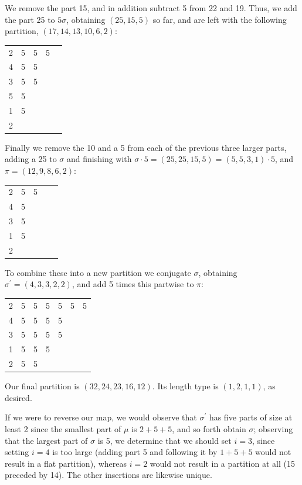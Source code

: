\documentclass{amsart}
\begin{document}
We remove the part 15, and in addition subtract 5 from 22 and 19.  Thus, we add the part 25 to $5\sigma$, obtaining $(25,15,5)$ so far, and are left with the following partition, $(17, 14, 13, 10, 6, 2)$:

\begin{center}
\begin{tabular}{ccccc}
2 & 5 & 5 & 5 & \\
4 & 5 & 5 & & \\
3 & 5 & 5 & & \\
5 & 5 & & & \\
1 & 5 & & & \\
2 & & & & 
\end{tabular}
\end{center}

Finally we remove the 10 and a 5 from each of the previous three larger parts, adding a 25 to $\sigma$ and finishing with $\sigma \cdot 5 = (25,25,15,5) = (5,5,3,1)\cdot 5$, and $\pi = (12,9,8,6,2)$:

\begin{center}
\begin{tabular}{ccccc}
2 & 5 & 5 & & \\
4 & 5 & & & \\
3 & 5 & & & \\
1 & 5 & & & \\
2 & & & & 
\end{tabular}
\end{center}

To combine these into a new partition we conjugate $\sigma$, obtaining $\sigma^{\prime} = (4,3,3,2,2)$, and add 5 times this partwise to $\pi$:

\begin{center}
\begin{tabular}{ccccccc}
2 & 5 & 5 & 5 & 5 & 5 & 5 \\
4 & 5 & 5 & 5 & 5 & & \\
3 & 5 & 5 & 5 & 5 & & \\
1 & 5 & 5 & 5 & & & \\
2 & 5 & 5 & & & & 
\end{tabular}
\end{center}

Our final partition is $(32, 24, 23, 16, 12)$.  Its length type is $(1,2,1,1)$, as desired.

If we were to reverse our map, we would observe that $\sigma^{\prime}$ has five parts of size at least 2 since the smallest part of $\mu$ is $2+5+5$, and so forth obtain $\sigma$; observing that the largest part of $\sigma$ is 5, we determine that we should set $i=3$, since setting $i=4$ is too large (adding part 5 and following it by $1+5+5$ would not result in a flat partition), whereas $i=2$ would not result in a partition at all (15 preceded by 14).  The other insertions are likewise unique.
\end{document}
